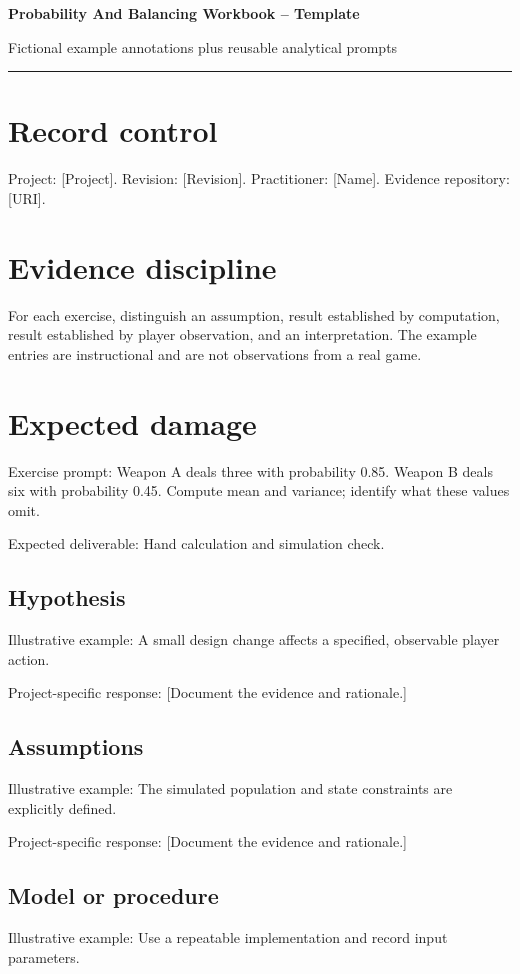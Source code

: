 \documentclass[11pt]{article}
\begin{document}
{\huge\bfseries\color{suiteblue} Probability And Balancing Workbook -- Template}\par
\vspace{0.15in}
{\normalsize\color{suitegray} Fictional example annotations plus reusable analytical prompts}\par
\vspace{0.15in}\hrule\vspace{0.15in}

\section{Record control}
Project: [Project]. Revision: [Revision]. Practitioner: [Name]. Evidence repository: [URI].


\section{Evidence discipline}
For each exercise, distinguish an assumption, result established by computation, result established by player observation, and an interpretation. The example entries are instructional and are not observations from a real game.


\section{Expected damage}
Exercise prompt: Weapon A deals three with probability 0.85. Weapon B deals six with probability 0.45. Compute mean and variance; identify what these values omit.

Expected deliverable: Hand calculation and simulation check.


\subsection{Hypothesis}
Illustrative example: A small design change affects a specified, observable player action.

Project-specific response: [Document the evidence and rationale.]


\subsection{Assumptions}
Illustrative example: The simulated population and state constraints are explicitly defined.

Project-specific response: [Document the evidence and rationale.]


\subsection{Model or procedure}
Illustrative example: Use a repeatable implementation and record input parameters.
\end{document}
